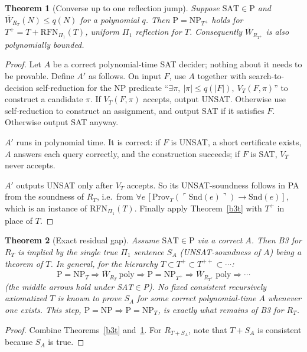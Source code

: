 \documentclass[11pt]{article}
\newtheorem{theorem}{Theorem}
\newcommand{\Wb}{\overline W}
\begin{document}
\begin{theorem}[Converse up to one reflection jump]\label{conv}
Suppose $\mathrm{SAT}\in\mathrm P$ and $\Wb_{R_T}(N)\le q(N)$ for a polynomial $q$. Then $\mathrm{P{=}NP}_{T^+}$ holds for $T^+=T+\mathrm{RFN}_{\Pi_1}(T)$, uniform $\Pi_1$ reflection for $T$. Consequently $\Wb_{R_{T^+}}$ is also polynomially bounded.
\end{theorem}
\begin{proof}
Let $A$ be a correct polynomial-time SAT decider; nothing about it needs to be provable. Define $A'$ as follows. On input $F$, use $A$ together with search-to-decision self-reduction for the NP predicate ``$\exists\pi,\ |\pi|\le q(|F|),\ V_T(F,\pi)$'' to construct a candidate $\pi$. If $V_T(F,\pi)$ accepts, output UNSAT. Otherwise use self-reduction to construct an assignment, and output SAT if it satisfies $F$. Otherwise output SAT anyway.

$A'$ runs in polynomial time. It is correct: if $F$ is UNSAT, a short certificate exists, $A$ answers each query correctly, and the construction succeeds; if $F$ is SAT, $V_T$ never accepts.

$A'$ outputs UNSAT only after $V_T$ accepts. So its UNSAT-soundness follows in PA from the soundness of $R_T$, i.e.\ from $\forall e\,[\mathrm{Prov}_T(\ulcorner\mathrm{Snd}(e)\urcorner)\rightarrow\mathrm{Snd}(e)]$, which is an instance of $\mathrm{RFN}_{\Pi_1}(T)$. Finally apply Theorem~\ref{b3t} with $T^+$ in place of $T$.
\end{proof}

\begin{theorem}[Exact residual gap]\label{gap}
Assume $\mathrm{SAT}\in\mathrm P$ via a correct $A$. Then B3 for $R_T$ is implied by the single true $\Pi_1$ sentence $S_A$ (UNSAT-soundness of $A$) being a theorem of $T$. In general, for the hierarchy $T\subset T^+\subset T^{++}\subset\cdots$:
\[
\mathrm{P{=}NP}_T\Rightarrow \Wb_{R_T}\ \text{poly}\Rightarrow \mathrm{P{=}NP}_{T^+}\Rightarrow \Wb_{R_{T^+}}\ \text{poly}\Rightarrow\cdots
\]
(the middle arrows hold under SAT$\in$P). No fixed consistent recursively axiomatized $T$ is known to prove $S_A$ for some correct polynomial-time $A$ whenever one exists. This step, $\mathrm{P{=}NP}\Rightarrow\mathrm{P{=}NP}_T$, is exactly what remains of B3 for $R_T$.
\end{theorem}
\begin{proof}
Combine Theorems~\ref{b3t} and~\ref{conv}. For $R_{T+S_A}$, note that $T+S_A$ is consistent because $S_A$ is true.
\end{proof}
\end{document}
